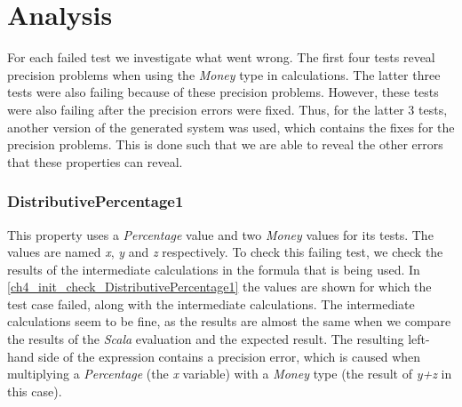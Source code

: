 \section{Analysis}
For each failed test we investigate what went wrong. The first four tests
reveal precision problems when using the \textit{Money} type in calculations.
The latter three tests were also failing because of these precision problems.
However, these tests were also failing after the precision errors were fixed.
Thus, for the latter 3 tests, another version of the generated system was used,
which contains the fixes for the precision problems. This is done such that we
are able to reveal the other errors that these properties can reveal.

\subsubsection{DistributivePercentage1}
\label{ssct:ch5_distributivePercentage1}
This property uses a \textit{Percentage} value and two \textit{Money} values
for its tests. The values are named \textit{x}, \textit{y} and \textit{z}
respectively. To check this failing test, we check the results of the
intermediate calculations in the formula that is being used. In
\autoref{ch4_init_check_DistributivePercentage1} the values are shown for which
the test case failed, along with the intermediate calculations. The intermediate
calculations seem to be fine, as the results are almost the same when we compare
the results of the \textit{Scala} evaluation and the expected result. The
resulting left-hand side of the expression contains a precision error, which is
caused when multiplying a \textit{Percentage} (the \textit{x} variable) with a
\textit{Money} type (the result of \textit{y+z} in this case).
